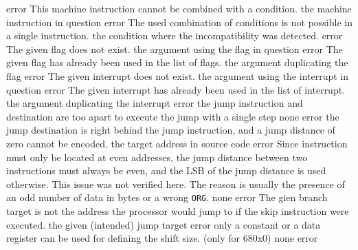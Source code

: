 \documentclass[12pt,twoside]{report}
\newcommand{\tty}[1]{{\tt #1}}
\begin{document}
\begin{description}
               {error}
               {This machine instruction cannot be combined with a
                condition.}
               {the machine instruction in question}
               {error}
               {The used combination of conditions is not possible
                in a single instruction.}
               {the condition where the incompatibility was detected.}
               {error}
               {The given flag does not exist.}
               {the argument using the flag in question}
               {error}
               {The given flag has already been used in the list of flags.}
               {the argument duplicating the flag}
               {error}
               {The given interrupt does not exist.}
               {the argument using the interrupt in question}
               {error}
               {The given interrupt has already been used in the list of interrupt.}
               {the argument duplicating the interrupt}
               {error}
               {the jump instruction and destination are too apart to
                execute the jump with a single step}
               {none}
               {error}
               {the jump destination is right behind the jump instruction,
                and a jump distance of zero cannot be encoded.}
               {the target address in source code}
               {error}
               {Since instruction must only be located at even addresses,
                the jump distance between two instructions must always be
                even, and the LSB of the jump distance is used otherwise.
                This issue was not verified here. The reason is usually the
                presence of an odd number of data in bytes or a wrong
                \tty{ORG}.}
               {none}
               {error}
               {The gien branch target is not the address the processor would
                jump to if the skip instruction were executed.}
               {the given (intended) jump target}
               {error}
               {only a constant or a data register can be used for defining
                the shift size. (only for 680x0)}
               {none}
               {error}

\end{description}
\end{document}
